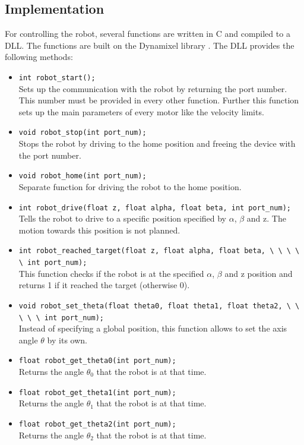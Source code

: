 \documentclass[./\jobname.tex]{subfiles}
\begin{document}
\subsection{Implementation}
For controlling the robot, several functions are written in C and compiled to a DLL. The functions are built on the Dynamixel library \cite{Robotis2019}. The DLL provides the following methods: 
\begin{itemize}
	\item \colorbox{light-gray}{\lstinline[basicstyle=\ttfamily\color{black}]|int robot_start();|} \\
	Sets up the communication with the robot by returning the port number. This number must be provided in every other function. Further this function sets up the main parameters of every motor like the velocity limits.
	\item \colorbox{light-gray}{\lstinline[basicstyle=\ttfamily\color{black}]|void robot_stop(int port_num);|} \\ 
	Stops the robot by driving to the home position and freeing the device with the port number. 
	\item \colorbox{light-gray}{\lstinline[basicstyle=\ttfamily\color{black}]|void robot_home(int port_num);|} \\
	Separate function for driving the robot to the home position. 
	\item \colorbox{light-gray}{\lstinline[basicstyle=\ttfamily\color{black}]|int robot_drive(float z, float alpha, float beta, int port_num);|} \\
	Tells the robot to drive to a specific position specified by $\alpha$, $\beta$ and z. The motion towards this position is not planned. 
	\item \colorbox{light-gray}{\lstinline[basicstyle=\ttfamily\color{black}]|int robot_reached_target(float z, float alpha, float beta, \ \ \ \ \ int port_num);|} \\
	This function checks if the robot is at the specified $\alpha$, $\beta$ and z position and returns 1 if it reached the target (otherwise 0).
	\item \colorbox{light-gray}{\lstinline[basicstyle=\ttfamily\color{black}]|void robot_set_theta(float theta0, float theta1, float theta2, \ \ \ \ \ int port_num);|} \\
	Instead of specifying a global position, this function allows to set the axis angle $\theta$ by its own. 
	\item \colorbox{light-gray}{\lstinline[basicstyle=\ttfamily\color{black}]|float robot_get_theta0(int port_num);|} \\
	Returns the angle $\theta_0$ that the robot is at that time.
	\item \colorbox{light-gray}{\lstinline[basicstyle=\ttfamily\color{black}]|float robot_get_theta1(int port_num);|} \\
	Returns the angle $\theta_1$ that the robot is at that time.
	\item \colorbox{light-gray}{\lstinline[basicstyle=\ttfamily\color{black}]|float robot_get_theta2(int port_num);|} \\ 
	Returns the angle $\theta_2$ that the robot is at that time.
\end{itemize}
\end{document}
